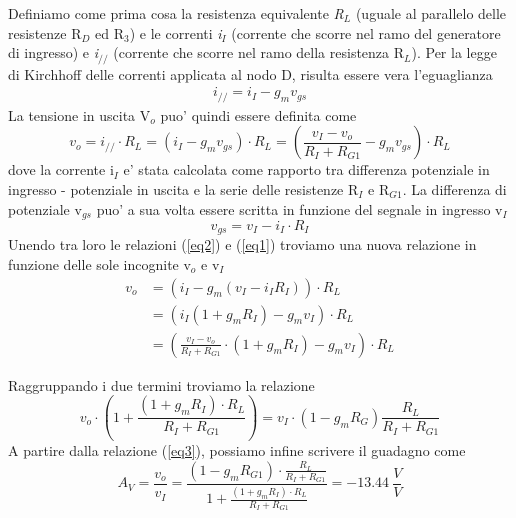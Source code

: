 \documentclass[a4paper,10pt]{article}
\begin{document}
Definiamo come prima cosa la resistenza equivalente \textit{R$_L$} (uguale al parallelo delle resistenze R$_D$ ed R$_3$) e le correnti \textit{i$_I$} (corrente che scorre nel ramo del generatore di ingresso) e \textit{i$_{//}$} (corrente che scorre nel ramo della resistenza R$_L$). Per la legge di Kirchhoff delle correnti applicata al nodo D, risulta essere vera l'eguaglianza
\begin{align*}
i_{//} = i_I - g_m v_{gs}
\end{align*}
La tensione in uscita V$_o$ puo' quindi essere definita come
\begin{equation}
\label{eq1}
v_o = i_{//}\cdot R_L = (i_I - g_m v_{gs})\cdot R_L = \left(\frac{v_I - v_o}{R_I+R_{G1}} - g_m v_{gs}\right) \cdot R_L
\end{equation}
dove la corrente i$_I$ e' stata calcolata come rapporto tra differenza potenziale in ingresso - potenziale in uscita e la serie delle resistenze R$_I$ e R$_{G1}$. La differenza di potenziale v$_{gs}$ puo' a sua volta essere scritta in funzione del segnale in ingresso v$_I$
\begin{equation}
\label{eq2}
v_{gs} = v_I - i_I \cdot R_I
\end{equation}
Unendo tra loro le relazioni (\ref{eq2}) e (\ref{eq1}) troviamo una nuova relazione in funzione delle sole incognite v$_o$ e v$_I$
\begin{equation*} \label{ol}
\begin{split}
v_o & = (i_I - g_m(v_I-i_I R_I))\cdot R_L \\
& = (i_I(1 + g_mR_I)-g_mv_I)\cdot R_L \\
& = \left( \frac{v_I-v_o}{R_I+R_{G1}} \cdot (1+g_mR_I) - g_m v_I \right) \cdot R_L 
\end{split}
\end{equation*}

\noindent Raggruppando i due termini troviamo la relazione
\begin{equation}
\label{eq3}
v_o \cdot \left( 1 + \frac{(1+g_mR_I)\cdot R_L}{R_I+R_{G1}} \right) = v_I \cdot (1-g_mR_G) \frac{R_L}{R_I+R_{G1}}
\end{equation}
A partire dalla relazione (\ref{eq3}), possiamo infine scrivere il guadagno come
\begin{equation*}
A_V = \frac{v_o}{v_I} = \frac{(1-g_mR_{G1})\cdot \frac{R_L}{R_I+R_{G1}}}{1+\frac{(1+g_mR_I)\cdot R_L}{R_I+R_{G1}}} = -13.44 \ \frac{V}{V}
\end{equation*}
\end{document}
